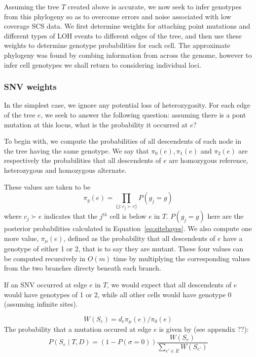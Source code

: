 \documentclass[../../main.tex]{subfiles}
\begin{document}
Assuming the tree $T$ created above is accurate, we now seek to infer genotypes from this phylogeny so as to overcome errors and noise associated with low coverage SCS data.
We first determine weights for attaching point mutations and different types of LOH events to different edges of the tree, and then use these weights to determine genotype probabilities for each cell.
The approximate phylogeny was found by combing information from across the genome, however to infer cell genotypes we shall return to considering individual loci.
\subsubsection{SNV weights}
In the simplest case, we ignore any potential loss of heterozygosity.
For each edge of the tree $e$, we seek to answer the following question: assuming there is a pont mutation at this locus, what is the probability it occurred at $e$?

To begin with, we compute the probabilities of all descendents of each node in the tree having the same genotype.
We say that $\pi_0(e), \pi_1(e)$ and $\pi_2(e)$ are respectively the probabilities that all descendents of $e$ are homozygous reference, heterozygous and homozygous alternate.

These values are taken to be
\begin{equation*}
\pi_g(e) = \prod_{\{j:c_j\succ e\}} P(g_j = g)
\end{equation*}
where $c_j\succ e$ indicates that the $j^{th}$ cell is below $e$ in $T$.
$P(g_j = g)$ here are the posterior probabilities calculated in Equation~\eqref{eq:sitebayes}.
We also compute one more value, $\pi_\mu(e)$, defined as the probability that all descendents of $e$ have a genotype of either 1 or 2, that is to say they are mutant.
These four values can be computed recursively in $O(m)$ time by multiplying the corresponding values from the two branches directy beneath each branch.

If an SNV occurred at edge $e$ in $T$, we would expect that all descendents of $e$ would have genotypes of 1 or 2, while all other cells would have genotype 0 (assuming infinite sites).

\begin{equation} \label{eq:Wmu}
W(S_e) = d_e\pi_\mu(e)/\pi_0(e)
\end{equation}
The probability that a mutation occured at edge $e$ is given by (see appendix ??):
\begin{equation*}
P(S_e\mid T, D) = (1-P(\sigma=0))\frac{W(S_e)}{\sum_{e'\in E}W(S_{e'})}
\end{equation*}
\end{document}
